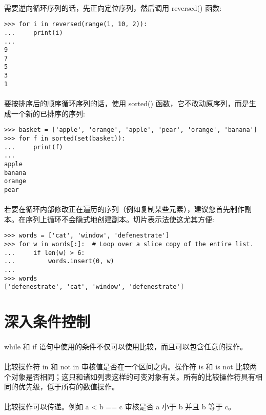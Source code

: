 \documentclass{article}
\begin{document}
\begin{CJK}{UTF8}{gbsn}
\paragraph{}
需要逆向循环序列的话，先正向定位序列，然后调用 reversed() 函数:
\begin{verbatim}
>>> for i in reversed(range(1, 10, 2)):
...     print(i)
...
9
7
5
3
1
\end{verbatim}
\paragraph{}
要按排序后的顺序循环序列的话，使用 sorted() 函数，它不改动原序列，而是生成一个新的已排序的序列:
\begin{verbatim}
>>> basket = ['apple', 'orange', 'apple', 'pear', 'orange', 'banana']
>>> for f in sorted(set(basket)):
...     print(f)
...
apple
banana
orange
pear
\end{verbatim}
\paragraph{}
若要在循环内部修改正在遍历的序列（例如复制某些元素），建议您首先制作副本。在序列上循环不会隐式地创建副本。切片表示法使这尤其方便:
\begin{verbatim}
>>> words = ['cat', 'window', 'defenestrate']
>>> for w in words[:]:  # Loop over a slice copy of the entire list.
...     if len(w) > 6:
...         words.insert(0, w)
...
>>> words
['defenestrate', 'cat', 'window', 'defenestrate']
\end{verbatim}
\section{深入条件控制}
\paragraph{}
while 和 if 语句中使用的条件不仅可以使用比较，而且可以包含任意的操作。
\paragraph{}
比较操作符 in 和 not in 审核值是否在一个区间之内。操作符 is 和 is not 比较两个对象是否相同；这只和诸如列表这样的可变对象有关。所有的比较操作符具有相同的优先级，低于所有的数值操作。
\paragraph{}
比较操作可以传递。例如 a < b == c 审核是否 a 小于 b 并且 b 等于 c。

\end{CJK}
\end{document}
